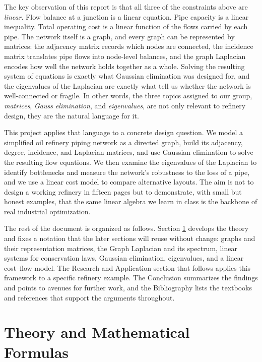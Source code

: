 \documentclass[11pt,a4paper]{article}
\begin{document}
The key observation of this report is that all three of the constraints
above are \emph{linear}. Flow balance at a junction is a linear
equation. Pipe capacity is a linear inequality. Total operating cost is
a linear function of the flows carried by each pipe. The network itself
is a graph, and every graph can be represented by matrices: the
adjacency matrix records which nodes are connected, the incidence matrix
translates pipe flows into node-level balances, and the graph Laplacian
encodes how well the network holds together as a whole. Solving the
resulting system of equations is exactly what Gaussian elimination was
designed for, and the eigenvalues of the Laplacian are exactly what tell
us whether the network is well-connected or fragile. In other words,
the three topics assigned to our group, \emph{matrices}, \emph{Gauss
elimination}, and \emph{eigenvalues}, are not only relevant to refinery
design, they are the natural language for it.

This project applies that language to a concrete design question. We
model a simplified oil refinery piping network as a directed graph,
build its adjacency, degree, incidence, and Laplacian matrices, and use
Gaussian elimination to solve the resulting flow equations. We then
examine the eigenvalues of the Laplacian to identify bottlenecks and
measure the network's robustness to the loss of a pipe, and we use a
linear cost model to compare alternative layouts. The aim is not to
design a working refinery in fifteen pages but to demonstrate, with
small but honest examples, that the same linear algebra we learn in
class is the backbone of real industrial optimization.

The rest of the document is organized as follows. Section
\ref{sec:theory} develops the theory and fixes a notation that the
later sections will reuse without change: graphs and their
representation matrices, the Graph Laplacian and its spectrum, linear
systems for conservation laws, Gaussian elimination, eigenvalues, and
a linear cost--flow model. The Research and Application section that
follows applies this framework to a specific refinery example. The
Conclusion summarizes the findings and points to avenues for further
work, and the Bibliography lists the textbooks and references that
support the arguments throughout.

\section{Theory and Mathematical Formulas}
\label{sec:theory}
\end{document}
